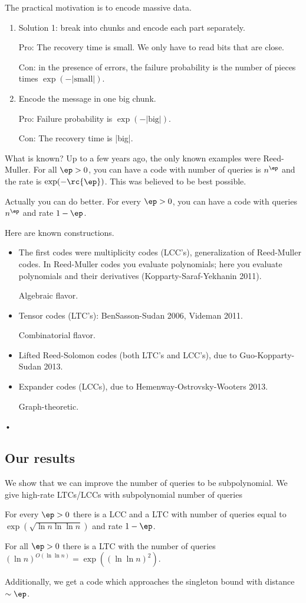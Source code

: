 The practical motivation is to encode massive data.
\begin{enumerate}
\item
Solution 1: break into chunks and encode each part separately.

Pro: The recovery time is small. We only have to read bits that are close.

Con: in the presence of errors, the failure probability is the number of pieces times $\exp(-|\text{small}|)$.
\item
Encode the message in one big chunk.

Pro: Failure probability is $\exp(-|\text{big}|)$.

Con: The recovery time is |big|.
\end{enumerate}
What is known? Up to a few years ago, the only known examples were Reed-Muller. For all $\ep>0$, you can have a code with number of queries is $n^\ep$ and the rate is $\exp(-\rc{\ep})$. This was believed to be best possible.

Actually you can do better. For every $\ep>0$, you can have a code with queries $n^\ep$ and rate $1-\ep$.

Here are known constructions.
\begin{itemize}
\item
The first codes were multiplicity codes (LCC's), generalization of Reed-Muller codes. In Reed-Muller codes you evaluate polynomials; here you evaluate polynomials and their derivatives (Kopparty-Saraf-Yekhanin 2011).

Algebraic flavor.
\item
Tensor codes (LTC's): BenSasson-Sudan 2006, Videman 2011.

Combinatorial flavor.
\item
Lifted Reed-Solomon codes (both LTC's and LCC's), due to Guo-Kopparty-Sudan 2013.
\item
Expander codes (LCCs), due to Hemenway-Ostrovsky-Wooters 2013.

Graph-theoretic.
\end{itemize}•
\subsection{Our results}
We show that we can improve the number of queries to be subpolynomial. We give high-rate LTCs/LCCs with subpolynomial number of queries
\begin{thm}
For every $\ep>0$ there is a LCC and a LTC with number of queries equal to $\exp(\sqrt{\ln n \ln \ln n})$ and rate $1-\ep$.
\end{thm}
\begin{thm}
For all $\ep>0$ there is a LTC with the number of queries $(\ln n)^{O(\ln \ln n)} = \exp((\ln \ln n)^2)$.
\end{thm}
Additionally, we get a code which approaches the singleton bound with distance $\sim \ep$.

